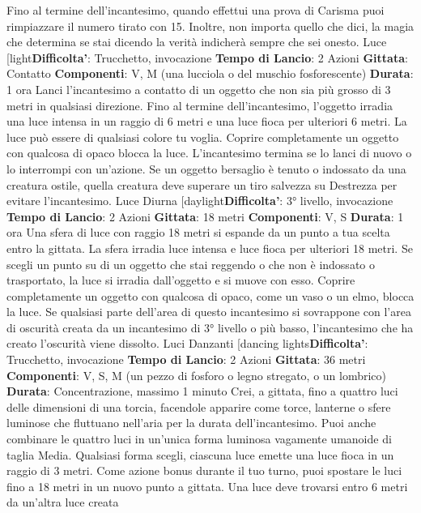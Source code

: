 \begin{multicols}{2}
Fino al termine dell’incantesimo, quando effettui una
prova di Carisma puoi rimpiazzare il numero tirato con
15. Inoltre, non importa quello che dici, la magia che
determina se stai dicendo la verità indicherà sempre
che sei onesto.
Luce
[light\textbf{Difficolta'}:
Trucchetto, invocazione
\textbf{Tempo di Lancio}: 2 Azioni
\textbf{Gittata}: Contatto
\textbf{Componenti}: V, M (una lucciola o del muschio
fosforescente)
\textbf{Durata}: 1 ora
Lanci l’incantesimo a contatto di un oggetto che non sia
più grosso di 3 metri in qualsiasi direzione. Fino al
termine dell’incantesimo, l’oggetto irradia una luce
intensa in un raggio di 6 metri e una luce fioca per
ulteriori 6 metri. La luce può essere di qualsiasi colore
tu voglia. Coprire completamente un oggetto con
qualcosa di opaco blocca la luce. L’incantesimo termina
se lo lanci di nuovo o lo interrompi con un’azione.
Se un oggetto bersaglio è tenuto o indossato da una
creatura ostile, quella creatura deve superare un tiro
salvezza su Destrezza per evitare l’incantesimo.
Luce Diurna
[daylight\textbf{Difficolta'}:
3° livello, invocazione
\textbf{Tempo di Lancio}: 2 Azioni
\textbf{Gittata}: 18 metri
\textbf{Componenti}: V, S
\textbf{Durata}: 1 ora
Una sfera di luce con raggio 18 metri si espande da un
punto a tua scelta entro la gittata. La sfera irradia luce
intensa e luce fioca per ulteriori 18 metri.
Se scegli un punto su di un oggetto che stai reggendo o
che non è indossato o trasportato, la luce si irradia
dall’oggetto e si muove con esso. Coprire
completamente un oggetto con qualcosa di opaco,
come un vaso o un elmo, blocca la luce.
Se qualsiasi parte dell’area di questo incantesimo si
sovrappone con l’area di oscurità creata da un
incantesimo di 3° livello o più basso, l’incantesimo che
ha creato l’oscurità viene dissolto.
Luci Danzanti
[dancing lights\textbf{Difficolta'}:
Trucchetto, invocazione
\textbf{Tempo di Lancio}: 2 Azioni
\textbf{Gittata}: 36 metri
\textbf{Componenti}: V, S, M (un pezzo di fosforo o legno
stregato, o un lombrico)
\textbf{Durata}: Concentrazione, massimo 1 minuto
Crei, a gittata, fino a quattro luci delle dimensioni di una
torcia, facendole apparire come torce, lanterne o sfere
luminose che fluttuano nell’aria per la durata
dell’incantesimo. Puoi anche combinare le quattro luci
in un’unica forma luminosa vagamente umanoide di
taglia Media. Qualsiasi forma scegli, ciascuna luce
emette una luce fioca in un raggio di 3 metri.
Come azione bonus durante il tuo turno, puoi spostare
le luci fino a 18 metri in un nuovo punto a gittata. Una
luce deve trovarsi entro 6 metri da un’altra luce creata

\end{multicols}
